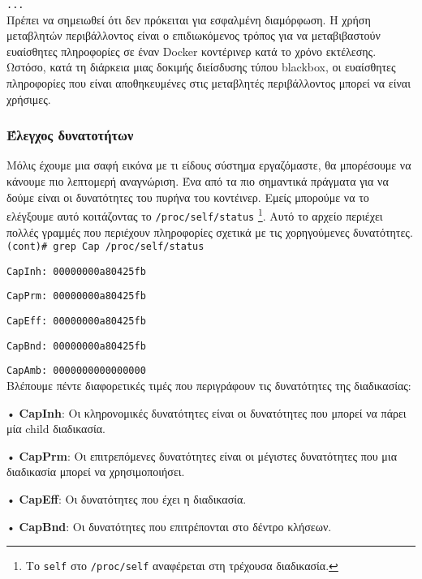 \texttt{\textlatin{...}}\\

Πρέπει να σημειωθεί ότι δεν πρόκειται για εσφαλμένη διαμόρφωση. Η χρήση
μεταβλητών περιβάλλοντος είναι ο επιδιωκόμενος τρόπος για να μεταβιβαστούν
ευαίσθητες πληροφορίες σε έναν \textlatin{Docker} κοντέρινερ κατά το χρόνο
εκτέλεσης. Ωστόσο, κατά τη διάρκεια μιας δοκιμής διείσδυσης τύπου
\textlatin{blackbox}, οι ευαίσθητες πληροφορίες που είναι αποθηκευμένες στις
μεταβλητές περιβάλλοντος μπορεί να είναι χρήσιμες.

\subsubsection{Έλεγχος δυνατοτήτων}


Μόλις έχουμε μια σαφή εικόνα με τι είδους σύστημα εργαζόμαστε, θα μπορέσουμε να
κάνουμε πιο λεπτομερή αναγνώριση. Ένα από τα πιο σημαντικά πράγματα για να δούμε
είναι οι δυνατότητες του πυρήνα του κοντέινερ. Εμείς μπορούμε να το ελέγξουμε
αυτό κοιτάζοντας το \texttt{\textlatin{/proc/self/status}} \footnote{Το
\texttt{\textlatin{self}} στο \texttt{\textlatin{/proc/self}} αναφέρεται στη
τρέχουσα διαδικασία.}. Αυτό το αρχείο περιέχει πολλές γραμμές που περιέχουν
πληροφορίες σχετικά με τις χορηγούμενες δυνατότητες. \\

\texttt{\textlatin{(cont)\# grep Cap /proc/self/status}}

\texttt{\textlatin{CapInh: 00000000a80425fb}}

\texttt{\textlatin{CapPrm: 00000000a80425fb}}

\texttt{\textlatin{CapEff: 00000000a80425fb}}

\texttt{\textlatin{CapBnd: 00000000a80425fb}}

\texttt{\textlatin{CapAmb: 0000000000000000}} \\

Βλέπουμε πέντε διαφορετικές τιμές που περιγράφουν τις δυνατότητες της
διαδικασίας:

• \textlatin{\textbf{CapInh}}: Οι κληρονομικές δυνατότητες είναι οι δυνατότητες που
μπορεί να πάρει μία \textlatin{child} διαδικασία.

• \textlatin{\textbf{CapPrm}}: Οι επιτρεπόμενες δυνατότητες είναι οι μέγιστες
δυνατότητες που μια διαδικασία μπορεί να χρησιμοποιήσει.

• \textlatin{\textbf{CapEff}}: Οι δυνατότητες που έχει η διαδικασία.

• \textlatin{\textbf{CapBnd}}: Οι δυνατότητες που επιτρέπονται στο δέντρο
κλήσεων.

